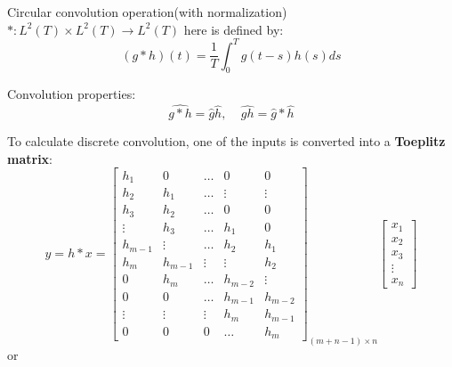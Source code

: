 \documentclass[12pt]{article}
\numberwithin{equation}{section}
\begin{document}
Circular convolution operation(with normalization) $*:L^2(T) \times L^2(T) \rightarrow L^2(T)$ here is defined by:
\begin{equation} \label{eq:circonv}
	 (g * h)(t) = \frac{1}{T} \int^{T}_{0} g(t-s) h(s) ds
\end{equation} \par
Convolution properties: 
\begin{equation}\label{eq:convprop}
	 \widehat{g*h}=\hat{g}\hat{h},\ \ \ \ \  \widehat{gh}=\hat{g}*\hat{h}
\end{equation} \par
To calculate discrete convolution, one of the inputs is converted into a \textbf{Toeplitz matrix}:
\begin{equation} \label{eq:convToep}
 y = h \ast x =
            \begin{bmatrix}
                h_1 & 0 & \ldots & 0 & 0 \\
                h_2 & h_1 & \ldots & \vdots & \vdots \\
                h_3 & h_2 & \ldots & 0 & 0 \\
                \vdots & h_3 & \ldots & h_1 & 0 \\
                h_{m-1} & \vdots & \ldots & h_2 & h_1 \\
                h_m & h_{m-1} & \vdots & \vdots & h_2 \\
                0 & h_m & \ldots & h_{m-2} & \vdots \\
                0 & 0 & \ldots & h_{m-1} & h_{m-2} \\
                \vdots & \vdots & \vdots & h_m & h_{m-1} \\
                0 & 0 & 0 & \ldots & h_m
            \end{bmatrix}_{(m+n-1) \times n}
            \begin{bmatrix}
                x_1 \\
                x_2 \\
                x_3 \\
                \vdots \\
                x_n
            \end{bmatrix}
\end{equation}
or 
\end{document}

